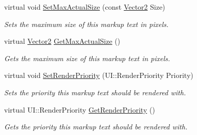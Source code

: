 \begin{DoxyCompactItemize}
virtual void \hyperlink{classphys_1_1UI_1_1MarkupText_a03b0e586c48e885b9c57968413603fa9}{SetMaxActualSize} (const \hyperlink{classphys_1_1Vector2}{Vector2} Size)
\begin{DoxyCompactList}\small\item\em Sets the maximum size of this markup text in pixels. \item\end{DoxyCompactList}\item 
virtual \hyperlink{classphys_1_1Vector2}{Vector2} \hyperlink{classphys_1_1UI_1_1MarkupText_a4a742f4d64038ded68c5480f4cf3e017}{GetMaxActualSize} ()
\begin{DoxyCompactList}\small\item\em Gets the maximum size of this markup text in pixels. \item\end{DoxyCompactList}\item 
virtual void \hyperlink{classphys_1_1UI_1_1MarkupText_a65662c49802fa5b82a04ac387b55493f}{SetRenderPriority} (UI::RenderPriority Priority)
\begin{DoxyCompactList}\small\item\em Sets the priority this markup text should be rendered with. \item\end{DoxyCompactList}\item 
virtual UI::RenderPriority \hyperlink{classphys_1_1UI_1_1MarkupText_a86afb23309534d86ed9675170b321874}{GetRenderPriority} ()
\begin{DoxyCompactList}\small\item\em Gets the priority this markup text should be rendered with. \item\end{DoxyCompactList}\end{DoxyCompactItemize}
